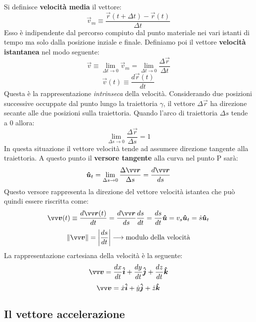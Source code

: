 \noindent Si definisce \textbf{velocità media} il vettore:
\[
     \vec{v}_m \equiv \frac{\vec{r}(t + \Delta t)-\vec{r}(t)}{\Delta t}    
\]
Esso è indipendente dal percorso compiuto dal punto materiale nei vari istanti di tempo ma solo dalla posizione
inziale e finale.
Definiamo poi il vettore \textbf{velocità istantanea} nel modo seguente:
\[
\vec{v} \equiv \lim_{\Delta t \to 0} \vec{v}_m = \lim_{\Delta t \to 0} \frac{\Delta \vec{r}}{\Delta t}      
\]
\[
\vec{v}(t) \equiv \frac{d \vec{r}(t)}{dt}   
\]
Questa è la rappresentazione \emph{intrinseca} della velocità. Considerando due posizioni successive occuppate dal 
punto lungo la traiettoria $\gamma $, il vettore $\Delta \vec{r}$ ha direzione secante alle due posizioni sulla traiettoria. 
Quando l'arco di traiettoria $\Delta s$ tende a 0 allora:
\[
    \lim_{\Delta s \to 0} \frac{\Delta \vec{r}}{\Delta s} = 1
\]
In questa situazione il vettore velocità tende ad assumere direzione tangente alla traiettoria. A questo punto il 
\textbf{versore tangente} alla curva nel punto P sarà:
\[
   \v{u}_t = \lim_{\Delta s \to 0} \frac{\Delta \vec{r}}{\Delta s} = \frac{d \vec{r}}{ds}
\]
Questo versore rappresenta la direzione del vettore velocità istantea che può quindi essere riscritta come:
\[
    \vec{v}(t) \equiv \frac{d \vec{r}(t)}{dt} = \frac{d\vec{r}}{ds} \frac{ds}{dt} = \frac{ds}{dt} \v{u}
    = v_s \v{u}_t = \dot{s} \v{u}_t 
\]
\[
 \Norm{v} =  \abs{\frac{ds}{dt} }    \longrightarrow \text{modulo della velocità}
\]
La rappresentazione cartesiana della velocità è la seguente:
\[
 \vec{v} =  \frac{dx}{dt} \v{i} + \frac{dy}{dt} \v{j} + \frac{dz}{dt} \v{k}    
\]
\[
\vec{v} = \dot{x}\v{i} +  \dot{y}\v{j} +  \dot{z}\v{k}    
\]

\subsection*{Il vettore accelerazione}

